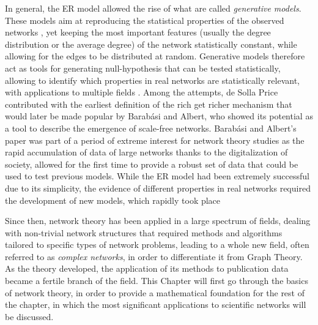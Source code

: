 In general, the ER model allowed the rise of what are called \textit{generative models}. 
These models aim at reproducing the statistical properties of the observed networks \cite{1608.00607}, yet keeping the most important features (usually
the degree distribution or the average degree) of the network
statistically constant, while allowing for the edges to be distributed at random. Generative models therefore act as tools for generating null-hypothesis that can be tested statistically,
allowing to identify which properties in real networks are statistically relevant, with applications to multiple fields \cite{Connor1979,Gail1977}. Among the attempts, de Solla Price
contributed with the earliest definition of the rich get richer mechanism \cite{Price1976} that would later be made popular by Barab{\'a}si and Albert, who
showed its potential \cite{Barabasi509} as a tool to describe the emergence of scale-free networks. Barab{\'a}si and Albert's paper was part of a period
of extreme interest for network theory studies as the rapid accumulation of data of large networks thanks to the digitalization of society, allowed
for the first time to provide a robust set of data that could be used to test previous models. While the ER model had been extremely successful due to 
its simplicity, the evidence of different properties in real networks required the development of new models, which rapidly took place \cite{Watts1998,Albert2002}


Since then, network theory has been applied in a large spectrum of fields, dealing with non-trivial network structures that required methods and algorithms tailored to specific types of network problems, leading to a whole new field, often referred to as \textit{complex networks}, in order to differentiate it from Graph Theory. As the theory developed,
the application of its methods to publication data became a fertile branch of the field. 
This Chapter will first go through the basics of network theory, in order to provide a mathematical foundation for the rest of the chapter, in which the most significant
applications to scientific networks will be discussed.

